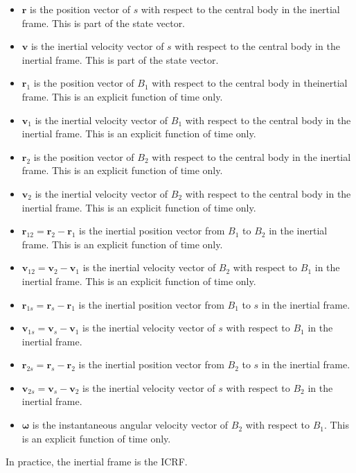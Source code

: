 \documentclass[]{article}
\newcommand{\vb}[1]{\bm{#1}} %
\begin{document}
\begin{itemize}
	\item $\vb{r}$ is the position vector of $s$ with respect to the central body in the inertial frame. This is part of the state vector.
	\item $\vb{v}$ is the inertial velocity vector of $s$ with respect to the central body in the inertial frame. This is part of the state vector.
	\item $\vb{r}_{1}$ is the position vector of $B_1$ with respect to the central body in theinertial frame. This is an explicit function of time only.
	\item $\vb{v}_{1}$ is the inertial velocity vector of $B_1$ with respect to the central body in the inertial frame. This is an explicit function of time only.
	\item $\vb{r}_{2}$ is the position vector of $B_2$ with respect to the central body in the inertial frame. This is an explicit function of time only.
	\item $\vb{v}_{2}$ is the inertial velocity vector of $B_2$ with respect to the central body in the inertial frame. This is an explicit function of time only.
	\item $\vb{r}_{12} = \vb{r}_2 - \vb{r}_1$ is the inertial position vector from $B_1$ to $B_2$ in the inertial frame. This is an explicit function of time only.
	\item $\vb{v}_{12} = \vb{v}_2 - \vb{v}_1$ is the inertial velocity vector of $B_2$ with respect to $B_1$ in the inertial frame. This is an explicit function of time only.
	\item $\vb{r}_{1s} = \vb{r}_s - \vb{r}_1$ is the inertial position vector from $B_1$ to $s$ in the inertial frame.
	\item $\vb{v}_{1s} = \vb{v}_s - \vb{v}_1$ is the inertial velocity vector of $s$ with respect to $B_1$ in the inertial frame.
	\item $\vb{r}_{2s} = \vb{r}_s - \vb{r}_2$ is the inertial position vector from $B_2$ to $s$ in the inertial frame.
	\item $\vb{v}_{2s} = \vb{v}_s - \vb{v}_2$ is the inertial velocity vector of $s$ with respect to $B_2$ in the inertial frame.
	\item $\vb{\omega}$ is the instantaneous angular velocity vector of $B_2$ with respect to $B_1$. This is an explicit function of time only.
\end{itemize}

In practice, the inertial frame is the ICRF.
\end{document}
